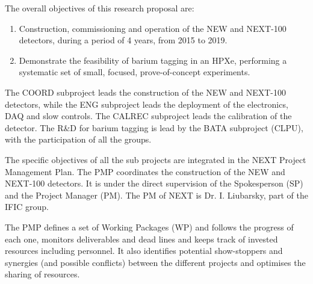 

The overall objectives of this research proposal are:

\begin{enumerate}
\item Construction, commissioning and operation of the NEW and NEXT-100 detectors, during a period of 4 years, from 2015 to 2019.
\item Demonstrate the feasibility of barium tagging in an HPXe, performing a systematic set of small, focused, prove-of-concept experiments. 
\end{enumerate}
  
The COORD subproject leads the construction of the NEW and NEXT-100 detectors, while the ENG subproject leads the deployment of the electronics, DAQ and slow controls. The CALREC subproject leads the calibration of the detector. The R\&D for barium tagging is lead by the BATA subproject (CLPU), with the participation of all the groups.   

The specific objectives of all the sub projects are integrated in the NEXT Project Management Plan. 
The PMP coordinates the construction of the NEW and NEXT-100 detectors. It is under the direct supervision of the Spokesperson (SP) and the Project Manager (PM). The PM of NEXT is Dr. I. Liubarsky, part of the IFIC group. 

The PMP defines a set of Working Packages (WP) and follows the progress of each one, monitors deliverables and dead lines and keeps track of invested resources including personnel. It also identifies potential show-stoppers and synergies (and possible conflicts) between the different projects and optimises the sharing of resources. 



